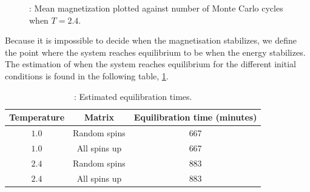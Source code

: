 \documentclass{article}
\begin{document}
{		\begin{figure}[H]
		\caption{: Mean magnetization plotted against number of Monte Carlo cycles when $T = 2.4$. }
		\label{fig:steady_M_highT}
		\end{figure}

		Because it is impossible to decide when the magnetisation stabilizes, we define the point where the system reaches equilibrium to be when the energy stabilizes.
		The estimation of when the system reaches equilibrium for the different initial conditions is found in the following table, \ref{Tab:equilibration_times}.

		{\renewcommand{\arraystretch}{1.5}
		\begin{table}[h!]
			\caption{: Estimated equilibration times.}
				\label{Tab:equilibration_times}
				\centering
			\begin{tabular}{c c c}
					Temperature & Matrix & Equilibration time (minutes)\\
					\hline
					$1.0$ & Random spins & 667 \\
					$1.0$ & All spins up & 667 \\
					$2.4$ & Random spins & 883 \\
					$2.4$ & All spins up & 883 \\
				\hline
			\end{tabular}
		\end{table}

}}
\end{document}
